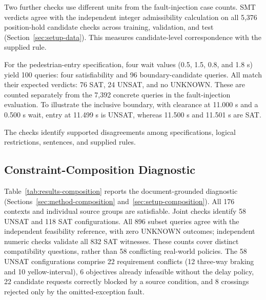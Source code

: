 Two further checks use different units from the fault-injection case counts.
SMT verdicts agree with the independent integer admissibility calculation on
all 5,376 position-hold candidate checks across training, validation, and test
(Section~\ref{sec:setup-data}). This measures candidate-level correspondence
with the supplied rule.

For the pedestrian-entry specification, four wait values (0.5, 1.5, 0.8,
and 1.8 s) yield 100 queries: four satisfiability and 96 boundary-candidate
queries. All match their expected verdicts: 76 SAT, 24 UNSAT, and no UNKNOWN.
These are counted separately from the 7,392 concrete queries in the
fault-injection evaluation. To illustrate the inclusive boundary, with
clearance at 11.000 s and a 0.500 s wait, entry at 11.499 s is UNSAT,
whereas 11.500 s and 11.501 s are SAT.

The checks identify supported disagreements among specifications, logical
restrictions, sentences, and supplied rules.

\subsection{Constraint-Composition Diagnostic}\label{sec:results-composition}

Table~\ref{tab:results-composition} reports the document-grounded diagnostic
(Sections~\ref{sec:method-composition} and~\ref{sec:setup-composition}). All 176
contexts and individual source groups are satisfiable. Joint checks identify
58 UNSAT and 118 SAT configurations. All 896 subset queries agree with the
independent feasibility reference, with zero UNKNOWN outcomes; independent
numeric checks validate all 832 SAT witnesses. These counts cover distinct
compatibility questions, rather than 58 conflicting real-world policies.
The 58 UNSAT configurations comprise 22 requirement conflicts (12 three-way
braking and 10 yellow-interval), 6 objectives already infeasible without the
delay policy, 22 candidate requests correctly blocked by a source condition,
and 8 crossings rejected only by the omitted-exception fault.

